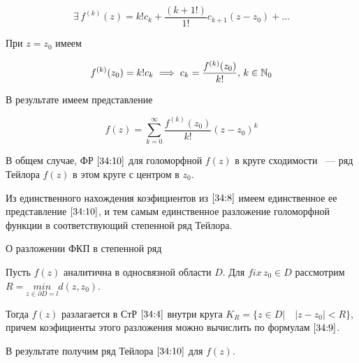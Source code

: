 \documentclass[../../main.tex]{subfiles}
\begin{document}
\[ \exists\, f^{(k)}(z) = k!c_k + \frac{(k + 1!)}{1!}c_{k + 1}(z - z_0) + \ldots \]

При $ z = z_0 $ имеем

\begin{equation}\label{34:9}
	f^{(k)}(z_0) = k!c_k \implies c_k = \frac{f^{(k)}(z_0)}{k!},\, k \in \mathbb{N}_0
\end{equation}

В результате имеем представление

\begin{equation}\label{34:10}
	f(z) = \sum\limits_{k = 0}^{\infty} \frac{f^{(k)}(z_0)}{k!}(z - z_0)^k
\end{equation}

В общем случае, ФР $ \eqref{34:10} $ для голоморфной $ f(z) $ в круге сходимости ~--- ряд Тейлора $ f(z) $ в этом круге с центром в $ z_0 $.

Из единственного нахождения коэфициентов из $ \eqref{34:8} $ имеем единственное ее представление $ \eqref{34:10} $, и тем самым единственное разложение голоморфной функции в соответствующий степенной ряд Тейлора.

\begin{thm}{О разложении ФКП в степенной ряд}
	\;
	
	Пусть $ f(z) $ аналитична в односвязной области $ D $. Для $ fix\, z_0 \in D $ рассмотрим $ R = \underset{z \in \partial D = l}{min}d(z, z_0) $.
	
	Тогда $ f(z) $ разлагается в СтР $ \eqref{34:4} $ внутри круга $ K_R = \{z \in D | \quad |z - z_0| < R \} $, причем коэфициенты этого разложения можно вычислить по формулам $ \eqref{34:9} $.
	
	В результате получим ряд Тейлора $ \eqref{34:10} $ для $f(z)$.
\end{thm}
\end{document}
